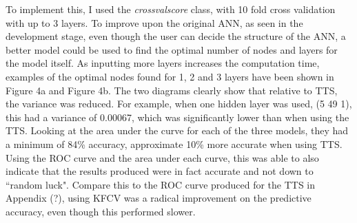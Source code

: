 \documentclass[11pt]{article}
\begin{document}
To implement this, I used the \textit{cross\textunderscore val\textunderscore score} class, with 10 fold cross validation with up to 3 layers. To improve upon the original ANN, as seen in the development stage, even though the user can decide the structure of the ANN, a better model could be used to find the optimal number of nodes and layers for the model itself. As inputting more layers increases the computation time, examples of the optimal nodes found for 1, 2 and 3 layers have been shown in Figure 4a and Figure 4b. 
The two diagrams clearly show that relative to TTS, the variance was reduced. For example, when one hidden layer was used, (5 49 1), this had a variance of 0.00067, which was significantly lower than when using the TTS. Looking at the area under the curve for each of the three models, they had a minimum of 84\% accuracy, approximate 10\% more accurate when using TTS. Using the ROC curve and the area under each curve, this was able to also indicate that the results produced were in fact accurate and not down to ``random luck". Compare this to the ROC curve produced for the TTS in Appendix (?), using KFCV was a radical improvement on the predictive accuracy, even though this performed slower. 
\end{document}
